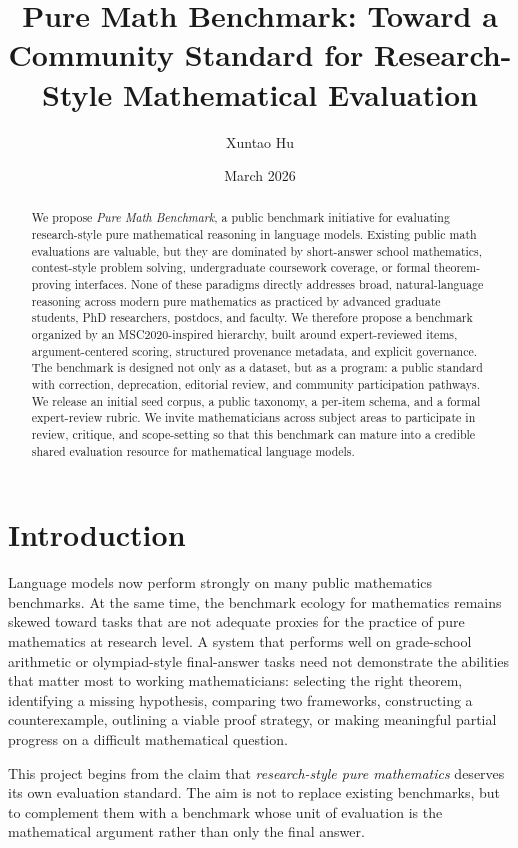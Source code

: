 \documentclass[11pt]{article}
\title{Pure Math Benchmark: Toward a Community Standard for Research-Style Mathematical Evaluation}
\author{Xuntao Hu}
\date{March 2026}
\begin{document}
\maketitle

\begin{abstract}
We propose \emph{Pure Math Benchmark}, a public benchmark initiative for evaluating research-style pure mathematical reasoning in language models. Existing public math evaluations are valuable, but they are dominated by short-answer school mathematics, contest-style problem solving, undergraduate coursework coverage, or formal theorem-proving interfaces. None of these paradigms directly addresses broad, natural-language reasoning across modern pure mathematics as practiced by advanced graduate students, PhD researchers, postdocs, and faculty. We therefore propose a benchmark organized by an MSC2020-inspired hierarchy, built around expert-reviewed items, argument-centered scoring, structured provenance metadata, and explicit governance. The benchmark is designed not only as a dataset, but as a program: a public standard with correction, deprecation, editorial review, and community participation pathways. We release an initial seed corpus, a public taxonomy, a per-item schema, and a formal expert-review rubric. We invite mathematicians across subject areas to participate in review, critique, and scope-setting so that this benchmark can mature into a credible shared evaluation resource for mathematical language models.
\end{abstract}

\section{Introduction}

Language models now perform strongly on many public mathematics benchmarks. At the same time, the benchmark ecology for mathematics remains skewed toward tasks that are not adequate proxies for the practice of pure mathematics at research level. A system that performs well on grade-school arithmetic or olympiad-style final-answer tasks need not demonstrate the abilities that matter most to working mathematicians: selecting the right theorem, identifying a missing hypothesis, comparing two frameworks, constructing a counterexample, outlining a viable proof strategy, or making meaningful partial progress on a difficult mathematical question.

This project begins from the claim that \emph{research-style pure mathematics} deserves its own evaluation standard. The aim is not to replace existing benchmarks, but to complement them with a benchmark whose unit of evaluation is the mathematical argument rather than only the final answer.
\end{document}
